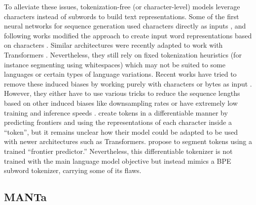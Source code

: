 To alleviate these issues, tokenization-free (or character-level) models leverage characters instead of subwords to build text representations. Some of the first neural networks for sequence generation used characters directly as inputs \citep{sutskever2011generating,graves2013generating}, and following works modified the approach to create input word representations based on characters \citep{kim2016character,Jzefowicz2016ExploringTL,peters-etal-2018-deep}. Similar architectures were recently adapted to work with Transformers \citep{el-boukkouri-etal-2020-characterbert,ma-etal-2020-charbert}. Nevertheless, they still rely on fixed tokenization heuristics (for instance segmenting using whitespaces) which may not be suited to some languages or certain types of language variations. Recent works have tried to remove these induced biases by working purely with characters or bytes as input \citep{clark2022canine,tay2021charformer,xue2022byt5}. However, they either have to use various tricks to reduce the sequence lengths based on other induced biases like downsampling rates \citep{clark2022canine,tay2021charformer} or have extremely low training and inference speeds \citep{xue2022byt5}. \citet{chung2016hierarchical} create tokens in a differentiable manner by predicting frontiers and using the representations of each character inside a ``token'', but it remains unclear how their model could be adapted to be used with newer architectures such as Transformers. \citet{mofijul2022vocabulary} propose to segment tokens using a trained ``frontier predictor.'' Nevertheless, this differentiable tokenizer is not trained with the main language model objective but instead mimics a BPE subword tokenizer, carrying some of its flaws.

\subsection{MANTa}


